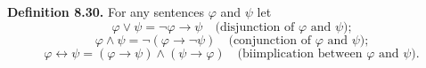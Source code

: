 \textbf{Definition 8.30.} For any sentences $\varphi$ and $\psi$ let
$$\varphi \lor \psi = \neg \varphi \rightarrow \psi \quad \text{(disjunction of $\varphi$ and $\psi$);}$$
$$\varphi \land \psi = \neg (\varphi \rightarrow \neg \psi) \quad \text{(conjunction of $\varphi$ and $\psi$);}$$
$$\varphi \leftrightarrow \psi = (\varphi \rightarrow \psi) \land (\psi \rightarrow \varphi) \quad \text{(biimplication between $\varphi$ and $\psi$).}$$
